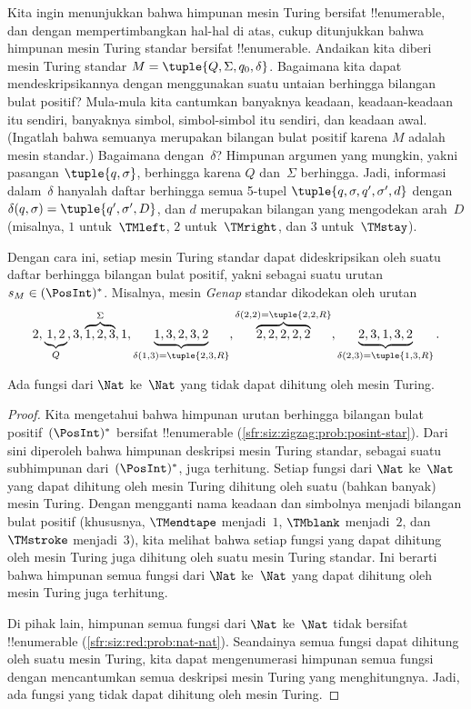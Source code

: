 \documentclass[../../../include/open-logic-section]{subfiles}
\begin{document}
\begin{explain}
Kita ingin menunjukkan bahwa himpunan mesin Turing bersifat !!{enumerable},
dan dengan mempertimbangkan hal-hal di atas, cukup ditunjukkan bahwa himpunan
mesin Turing standar bersifat !!{enumerable}. Andaikan kita diberi mesin
Turing standar $M = \tuple{Q, \Sigma, q_0, \delta}$. Bagaimana kita dapat
mendeskripsikannya dengan menggunakan suatu untaian berhingga bilangan bulat
positif? Mula-mula kita cantumkan banyaknya keadaan, keadaan-keadaan itu
sendiri, banyaknya simbol, simbol-simbol itu sendiri, dan keadaan awal.
(Ingatlah bahwa semuanya merupakan bilangan bulat positif karena $M$ adalah
mesin standar.) Bagaimana dengan~$\delta$? Himpunan argumen yang mungkin,
yakni pasangan $\tuple{q,\sigma}$, berhingga karena $Q$ dan~$\Sigma$
berhingga. Jadi, informasi dalam~$\delta$ hanyalah daftar berhingga semua
5-tupel $\tuple{q, \sigma, q', \sigma', d}$ dengan
$\delta(q,\sigma) = \tuple{q', \sigma', D}$, dan $d$ merupakan bilangan yang
mengodekan arah~$D$ (misalnya, $1$ untuk~$\TMleft$, $2$ untuk~$\TMright$,
dan $3$ untuk~$\TMstay$).

Dengan cara ini, setiap mesin Turing standar dapat dideskripsikan oleh suatu
daftar berhingga bilangan bulat positif, yakni sebagai suatu urutan $s_M \in
(\PosInt)^*$. Misalnya, mesin \emph{Genap} standar dikodekan oleh urutan
\[
2, \underbrace{1, 2}_Q, 3, \overbrace{1, 2, 3}^\Sigma, 1, \underbrace{1, 3, 2, 3, 2}_{\delta(1,3) = \tuple{2,3,R}},
\overbrace{2, 2, 2, 2, 2}^{\delta(2,2) = \tuple{2,2,R}},
\underbrace{2, 3, 1, 3, 2}_{\delta(2,3) = \tuple{1,3,R}}.
\]
\end{explain}

\begin{thm}
Ada fungsi dari $\Nat$ ke~$\Nat$ yang tidak dapat dihitung oleh mesin Turing.
\end{thm}

\begin{proof}
Kita mengetahui bahwa himpunan urutan berhingga bilangan bulat
positif~$(\PosInt)^*$ bersifat !!{enumerable}
(\cref{sfr:siz:zigzag:prob:posint-star}). Dari sini diperoleh bahwa himpunan
deskripsi mesin Turing standar, sebagai suatu subhimpunan dari~$(\PosInt)^*$,
juga terhitung. Setiap fungsi dari $\Nat$ ke~$\Nat$ yang dapat dihitung oleh
mesin Turing dihitung oleh suatu (bahkan banyak) mesin Turing. Dengan mengganti
nama keadaan dan simbolnya menjadi bilangan bulat positif (khususnya,
$\TMendtape$ menjadi~$1$, $\TMblank$ menjadi~$2$, dan $\TMstroke$ menjadi~$3$),
kita melihat bahwa setiap fungsi yang dapat dihitung oleh mesin Turing juga
dihitung oleh suatu mesin Turing standar. Ini berarti bahwa himpunan semua
fungsi dari $\Nat$ ke~$\Nat$ yang dapat dihitung oleh mesin Turing juga
terhitung.

Di pihak lain, himpunan semua fungsi dari $\Nat$ ke~$\Nat$ tidak bersifat
!!{enumerable} (\cref{sfr:siz:red:prob:nat-nat}). Seandainya semua fungsi dapat
dihitung oleh suatu mesin Turing, kita dapat mengenumerasi himpunan semua
fungsi dengan mencantumkan semua deskripsi mesin Turing yang menghitungnya.
Jadi, ada fungsi yang tidak dapat dihitung oleh mesin Turing.
\end{proof}
\end{document}
